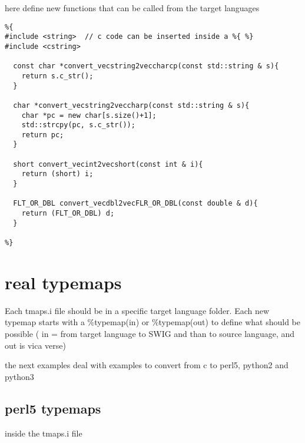 \documentclass[ twoside,openright,titlepage,numbers=noenddot,headinclude,
                footinclude=true, cleardoublepage=empty,abstractoff, 
                BCOR=5mm,paper=a4,fontsize=11pt,
                ngerman,american,
                ]{scrreprt} %
\begin{document}
here define new functions that can be called from the target languages
\begin{lstlisting}
%{
#include <string>  // c code can be inserted inside a %{ %}
#include <cstring>

  const char *convert_vecstring2veccharcp(const std::string & s){
    return s.c_str();
  }

  char *convert_vecstring2veccharp(const std::string & s){
    char *pc = new char[s.size()+1];
    std::strcpy(pc, s.c_str());
    return pc;
  }
  
  short convert_vecint2vecshort(const int & i){
    return (short) i;
  }

  FLT_OR_DBL convert_vecdbl2vecFLR_OR_DBL(const double & d){
    return (FLT_OR_DBL) d;
  }

%}

\end{lstlisting}


\section{real typemaps}
Each tmaps.i file should be in a specific target language folder.
Each new typemap starts with a \%typemap(in) or \%typemap(out) to define what should be possible ( in = from target language to SWIG and than to source language, and out is vica verse)

the next examples deal with examples to convert from c to perl5, python2 and python3


\subsection{perl5 typemaps}

inside the tmaps.i file
\end{document}
